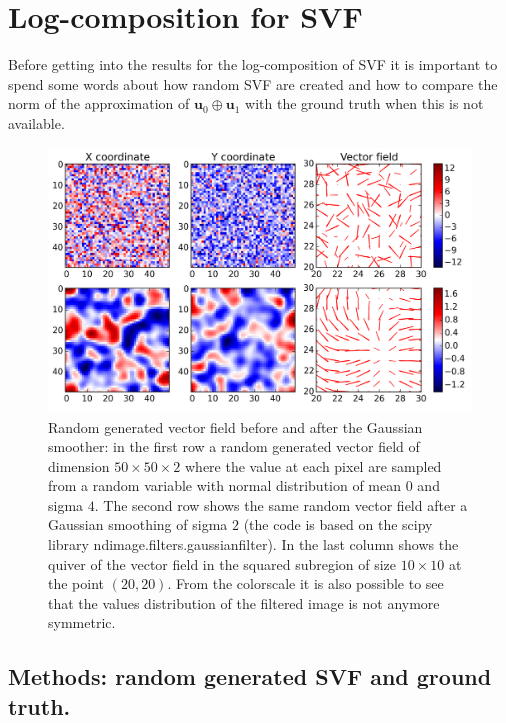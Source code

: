 \section{Log-composition for SVF}
Before getting into the results for the log-composition of SVF it is important to spend some words about how random SVF are created and how to compare the norm of the approximation of $\mathbf{u}_0\oplus \mathbf{u}_1$ with the ground truth when this is not available.
%
\begin{figure}[!ht]
	\hspace{-0.8cm}
	\includegraphics[scale=0.72]{figures/svf_gaussian_smoothing_effects.png}
	\caption{Random generated vector field before and after the Gaussian smoother: in the first row a random generated vector field of dimension $50\times 50 \times 2$ where the value at each pixel are sampled from a random variable with normal distribution of mean $0$ and sigma $4$. The second row shows the same random vector field after a Gaussian smoothing of sigma $2$ (the code is based on the scipy library ndimage.filters.gaussian\textunderscore filter). In the last column shows the quiver of the vector field in the squared subregion of size $10\times 10$ at the point $(20,20)$. From the colorscale it is also possible to see that the values distribution of the filtered image is not anymore symmetric. }
	\label{fig:SVF_gaussian_smoothing_effects}
\end{figure}
\subsection{Methods: random generated SVF and ground truth.}

